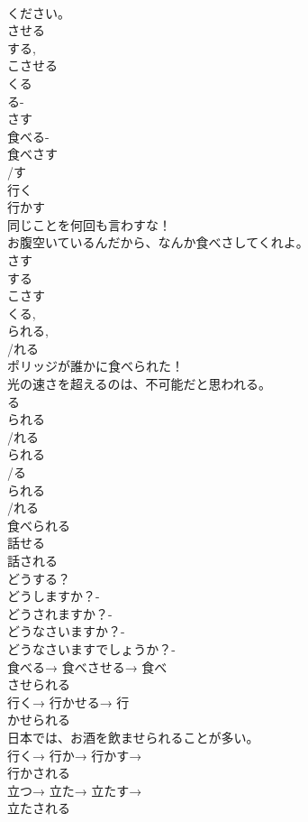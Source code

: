 \documentclass[8pt]{extreport}
\begin{document}
\begin{CJK}{UTF8}{min}
\\	ください。
\\	させる	
\\	する, 
\\	こさせる	
\\	くる 
\\	る-
\\	さす
\\	食べる-
\\	食べさす 
\\	/す
\\	行く 
\\	行かす 
\\	同じことを何回も言わすな！
\\	お腹空いているんだから、なんか食べさしてくれよ。
\\	さす	
\\	する 
\\	こさす	
\\	くる, 
\\	られる, 
\\	/れる　
\\	ポリッジが誰かに食べられた！
\\	光の速さを超えるのは、不可能だと思われる。
\\	る 
\\	られる 
\\	/れる
\\	られる
\\	/る
\\	られる
\\	/れる
\\	食べられる 
\\	話せる
\\	話される
\\	どうする？	
\\	どうしますか？- 
\\	どうされますか？- 
\\	どうなさいますか？- 
\\	どうなさいますでしょうか？- 
\\	食べる→ 食べさせる→ 食べ
\\	させられる 
\\	行く→ 行かせる→ 行
\\	かせられる 
\\	日本では、お酒を飲ませられることが多い。
\\	行く→ 行か→ 行かす→ 
\\	行かされる 
\\	立つ→ 立た→ 立たす→ 
\\	立たされる 

\end{CJK}
\end{document}
